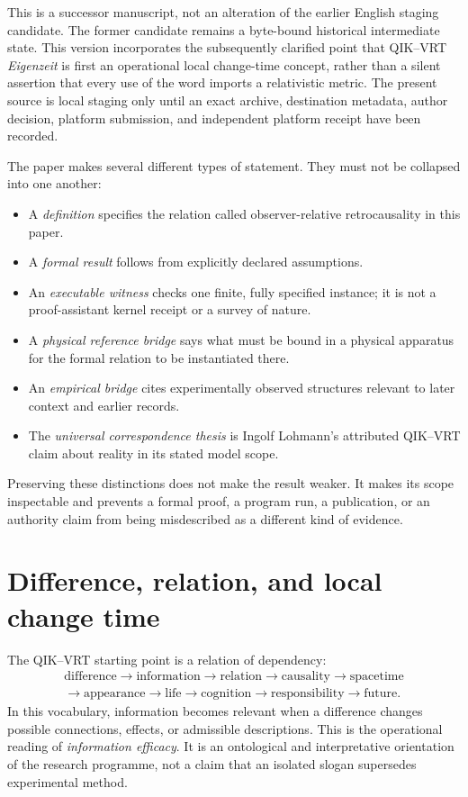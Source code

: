 \documentclass[11pt]{article}
\theoremstyle{remark}
\newcommand{\qikvrt}{QIK--VRT}
\begin{document}
This is a successor manuscript, not an alteration of the earlier English
staging candidate.  The former candidate remains a byte-bound historical
intermediate state.  This version incorporates the subsequently clarified
point that \qikvrt{} \emph{Eigenzeit} is first an operational local
change-time concept, rather than a silent assertion that every use of the
word imports a relativistic metric.  The present source is local staging only
until an exact archive, destination metadata, author decision, platform
submission, and independent platform receipt have been recorded.

The paper makes several different types of statement.  They must not be
collapsed into one another:

\begin{itemize}
  \item A \emph{definition} specifies the relation called
  observer-relative retrocausality in this paper.
  \item A \emph{formal result} follows from explicitly declared
  assumptions.
  \item An \emph{executable witness} checks one finite, fully specified
  instance; it is not a proof-assistant kernel receipt or a survey of nature.
  \item A \emph{physical reference bridge} says what must be bound in a
  physical apparatus for the formal relation to be instantiated there.
  \item An \emph{empirical bridge} cites experimentally observed structures
  relevant to later context and earlier records.
  \item The \emph{universal correspondence thesis} is Ingolf Lohmann's
  attributed QIK--VRT claim about reality in its stated model scope.
\end{itemize}

Preserving these distinctions does not make the result weaker.  It makes its
scope inspectable and prevents a formal proof, a program run, a publication,
or an authority claim from being misdescribed as a different kind of
evidence.

\section{Difference, relation, and local change time}
\label{sec:local-time}

The QIK--VRT starting point is a relation of dependency:
\[
\begin{gathered}
\text{difference}\longrightarrow\text{information}
\longrightarrow\text{relation}\longrightarrow\text{causality}
\longrightarrow\text{spacetime}\\
\longrightarrow\text{appearance}\longrightarrow\text{life}
\longrightarrow\text{cognition}\longrightarrow\text{responsibility}
\longrightarrow\text{future}.
\end{gathered}
\]
In this vocabulary, information becomes relevant when a difference changes
possible connections, effects, or admissible descriptions.  This is the
operational reading of \emph{information efficacy}.  It is an ontological and
interpretative orientation of the research programme, not a claim that an
isolated slogan supersedes experimental method.
\end{document}

